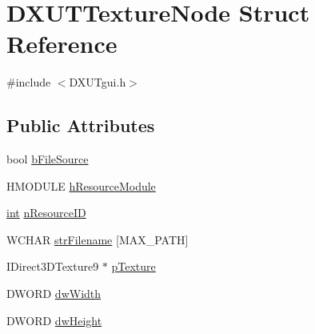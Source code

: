 \hypertarget{struct_d_x_u_t_texture_node}{
\section{DXUTTextureNode Struct Reference}
\label{struct_d_x_u_t_texture_node}
}


{\ttfamily \#include $<$DXUTgui.h$>$}\subsection*{Public Attributes}
\begin{DoxyCompactItemize}
\item 
bool \hyperlink{struct_d_x_u_t_texture_node_a6908a18496ab40bac0b8c6e63b7d28e3}{bFileSource}
\item 
HMODULE \hyperlink{struct_d_x_u_t_texture_node_a4e80e2d2c87816b394ed29294acc7909}{hResourceModule}
\item 
\hyperlink{_d_x_u_tgui_8cpp_a2d77ed03302b6978834ee3b6f57837fb}{int} \hyperlink{struct_d_x_u_t_texture_node_ae56b4afef5842ee40f2dd4c228b3b71d}{nResourceID}
\item 
WCHAR \hyperlink{struct_d_x_u_t_texture_node_af2e55954d921b023c968ae84e72d907d}{strFilename} \mbox{[}MAX\_\-PATH\mbox{]}
\item 
IDirect3DTexture9 $\ast$ \hyperlink{struct_d_x_u_t_texture_node_ac1c5b89eba3bd2883f9d346dae96b1b1}{pTexture}
\item 
DWORD \hyperlink{struct_d_x_u_t_texture_node_a29af5db8b2da2c07c6461a2090159463}{dwWidth}
\item 
DWORD \hyperlink{struct_d_x_u_t_texture_node_a25c59cf0fc86a4630fa55f0550339cf6}{dwHeight}
\end{DoxyCompactItemize}


